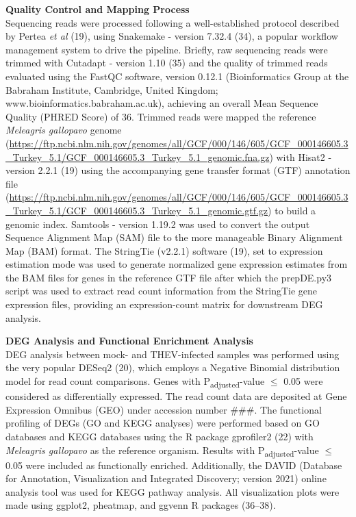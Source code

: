\documentclass[
]{article}
\begin{document}
\textbf{Quality Control and Mapping Process}\\
Sequencing reads were processed following a well-established protocol
described by Pertea \emph{et al} (19), using Snakemake - version 7.32.4
(34), a popular workflow management system to drive the pipeline.
Briefly, raw sequencing reads were trimmed with Cutadapt - version 1.10
(35) and the quality of trimmed reads evaluated using the FastQC
software, version 0.12.1 (Bioinformatics Group at the Babraham
Institute, Cambridge, United Kingdom;
www.bioinformatics.babraham.ac.uk), achieving an overall Mean Sequence
Quality (PHRED Score) of 36. Trimmed reads were mapped the reference
\emph{Meleagris gallopavo} genome
(\url{https://ftp.ncbi.nlm.nih.gov/genomes/all/GCF/000/146/605/GCF_000146605.3_Turkey_5.1/GCF_000146605.3_Turkey_5.1_genomic.fna.gz})
with Hisat2 - version 2.2.1 (19) using the accompanying gene transfer
format (GTF) annotation file
(\url{https://ftp.ncbi.nlm.nih.gov/genomes/all/GCF/000/146/605/GCF_000146605.3_Turkey_5.1/GCF_000146605.3_Turkey_5.1_genomic.gtf.gz})
to build a genomic index. Samtools - version 1.19.2 was used to convert
the output Sequence Alignment Map (SAM) file to the more manageable
Binary Alignment Map (BAM) format. The StringTie (v2.2.1) software (19),
set to expression estimation mode was used to generate normalized gene
expression estimates from the BAM files for genes in the reference GTF
file after which the prepDE.py3 script was used to extract read count
information from the StringTie gene expression files, providing an
expression-count matrix for downstream DEG analysis.

\textbf{DEG Analysis and Functional Enrichment Analysis}\\
DEG analysis between mock- and THEV-infected samples was performed using
the very popular DESeq2 (20), which employs a Negative Binomial
distribution model for read count comparisons. Genes with
P\textsubscript{adjusted}-value \(\leq\) 0.05 were considered as
differentially expressed. The read count data are deposited at Gene
Expression Omnibus (GEO) under accession number \#\#\#. The functional
profiling of DEGs (GO and KEGG analyses) were performed based on GO
databases and KEGG databases using the R package gprofiler2 (22) with
\emph{Meleagris gallopavo} as the reference organism. Results with
P\textsubscript{adjusted}-value \(\leq\) 0.05 were included as
functionally enriched. Additionally, the DAVID (Database for Annotation,
Visualization and Integrated Discovery; version 2021) online analysis
tool was used for KEGG pathway analysis. All visualization plots were
made using ggplot2, pheatmap, and ggvenn R packages (36--38).
\end{document}
